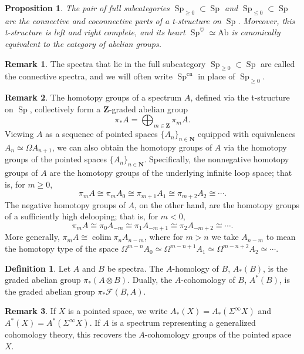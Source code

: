 \documentclass[12pt]{article}
\newtheorem{proposition}{Proposition}[subsection]
\theoremstyle{definition}
\newtheorem{definition}{Definition}[subsection]
\newtheorem{remark}{Remark}[subsection]
\newcommand{\F}{\mathcal{F}}
\newcommand{\NN}{\mathbf{N}}
\newcommand{\ZZ}{\mathbf{Z}}
\DeclareMathOperator{\colim}{colim}
\DeclareMathOperator{\Sp}{Sp}
\newcommand{\Ab}{\mathrm{Ab}}
\newcommand{\cn}{\mathrm{cn}}
\begin{document}
\begin{proposition}{\em \cite[Proposition 1.4.3.6]{HA}}
The pair of full subcategories $\Sp_{\geq 0}\subset\Sp$ and $\Sp_{\leq 0}\subset\Sp$ are the connective and coconnective parts of a t-structure on $\Sp$.
Moreover, this t-structure is left and right complete, and its heart $\Sp^\heartsuit\simeq\Ab$ is canonically equivalent to the category of abelian groups.
\end{proposition}


\begin{remark}
The spectra that lie in the full subcategory $\Sp_{\geq 0}\subset\Sp$ are called the connective spectra, and we will often write $\Sp^{\cn}$ in place of $\Sp_{\geq 0}$.
\end{remark}

\begin{remark}
The homotopy groups of a spectrum $A$, defined via the t-structure on $\Sp$, collectively form a $\ZZ$-graded abelian group
\[
\pi_* A=\bigoplus_{m\in\ZZ}\pi_m A .
\]
Viewing $A$ as a sequence of pointed spaces $\{A_n\}_{n\in\NN}$ equipped with equivalences $A_n\simeq\Omega A_{n+1}$, we can also obtain the homotopy groups of $A$ via the homotopy groups of the pointed spaces $\{A_n\}_{n\in\NN}$.
Specifically, the nonnegative homotopy groups of $A$ are the homotopy groups of the underlying infinite loop space; that is, for $m\geq 0$,
\[
\pi_m A\cong\pi_m A_0\cong\pi_{m+1} A_1\cong\pi_{m+2}A_2\cong\cdots.
\]
The negative homotopy groups of $A$, on the other hand, are the homotopy groups of a sufficiently high delooping; that is, for $m<0$,
\[
\pi_m A\cong\pi_0 A_{-m}\cong\pi_1 A_{-m+1}\cong\pi_2 A_{-m+2}\cong\cdots.
\]
More generally, $\pi_m A\cong\colim\pi_{n} A_{n-m}$, where for $m>n$ we take $A_{n-m}$ to mean the homotopy type of the space $\Omega^{m-n}A_0\simeq\Omega^{m-n+1}A_1\simeq\Omega^{m-n+2}A_2\simeq\cdots$.
\end{remark}

\begin{definition}
Let $A$ and $B$ be spectra.
The $A$-homology of $B$, $A_*(B)$, is the graded abelian group $\pi_*(A\otimes B)$.
Dually, the $A$-cohomology of $B$, $A^*(B)$, is the graded abelian group $\pi_*\F(B,A)$.
\end{definition}

\begin{remark}
If $X$ is a pointed space, we write $A_*(X)=A_*(\Sigma^\infty X)$ and $A^*(X)=A^*(\Sigma^\infty X)$.
If $A$ is a spectrum representing a generalized cohomology theory, this recovers the $A$-cohomology groups of the pointed space $X$.
\end{remark}
\end{document}
